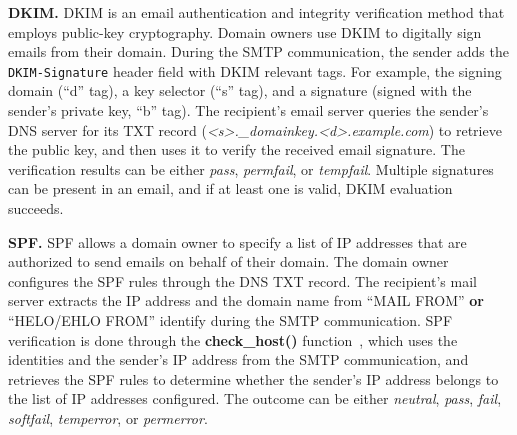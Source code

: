 \textbf{\acrfull{DKIM}.}
\acrshort{DKIM} is an email authentication and integrity verification method that employs public-key cryptography. Domain owners use \gls{DKIM} to digitally sign emails from their domain. During the \gls{SMTP} communication, the sender adds the \texttt{DKIM-Signature} header field with \gls{DKIM} relevant tags. For example, the signing domain (``d'' tag), a key selector (``s'' tag), and a signature (signed with the sender's private key, ``b'' tag).
The recipient's email server queries the sender's \gls{DNS} server for its TXT record (\eg \textit{<s>.\_domainkey.<d>.example.com}) to retrieve the public key, and then uses it to verify the received email signature. The verification results can be either \textit{pass}, \textit{permfail}, or \textit{tempfail}. Multiple signatures can be present in an email, and if at least one is valid, \gls{DKIM} evaluation succeeds.

\textbf{\acrfull{SPF}.}
\acrshort{SPF} allows a domain owner to specify a list of IP addresses that are authorized to send emails on behalf of their domain.
The domain owner configures the \gls{SPF} rules through the \gls{DNS} TXT record.
The recipient's mail server extracts the IP address and the domain name from ``MAIL FROM'' \textbf{or} ``HELO/EHLO FROM'' identify during the \gls{SMTP} communication.
\gls{SPF} verification is done through the \textbf{check\_host()} function~\cite{rfc7208}, which uses the identities and the sender's IP address from the \gls{SMTP} communication, and retrieves the \gls{SPF} rules to determine whether the sender's IP address belongs to the list of IP addresses configured.
The outcome can be either \textit{neutral}, \textit{pass}, \textit{fail}, \textit{softfail}, \textit{temperror}, or \textit{permerror}.

